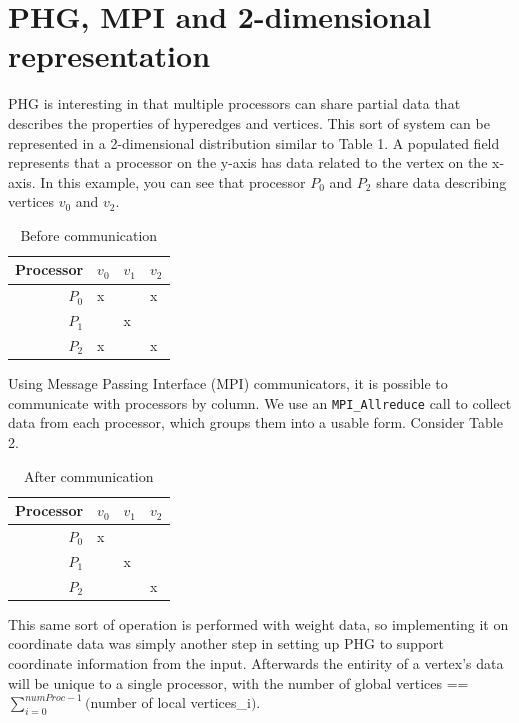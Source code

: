 \documentclass[12pt]{article}
\begin{document}
\section{PHG, MPI and 2-dimensional representation}
PHG is interesting in that multiple processors can share partial data
that describes the properties of hyperedges and vertices. This sort of
system can be represented in a 2-dimensional distribution similar to
Table 1. A populated field represents that a processor on the y-axis has
data related to the vertex on the x-axis. In this example, you can see
that processor $P_0$ and $P_2$ share data describing vertices $v_0$ and
$v_2$.

\begin{table}[h]
\begin{center}
\begin{tabular}{|r|l|l|l|}
  \hline
  Processor & $v_0$ & $v_1$ & $v_2$ \\
  \hline
  $P_0$ & x &   & x \\
  \hline
  $P_1$ &   & x &   \\  
  \hline
  $P_2$ & x &   & x \\
  \hline
\end{tabular}
\caption{\label{tab:0/tc} Before communication}
\end{center}
\end{table}

Using Message Passing Interface (MPI) communicators, it is possible to
communicate with processors by column. We use an \texttt{MPI\_Allreduce}
call to collect data from each processor, which groups them into a usable
form. Consider Table 2.

\begin{table}[h]
\begin{center}
\begin{tabular}{|r|l|l|l|}
  \hline
  Processor & $v_0$ & $v_1$ & $v_2$ \\
  \hline
  $P_0$ & x &   &   \\
  \hline
  $P_1$ &   & x &   \\  
  \hline
  $P_2$ &   &   & x \\
  \hline
\end{tabular}
\caption{\label{tab:1/tc} After communication}
\end{center}
\end{table}

This same sort of operation is performed with weight data, so implementing
it on coordinate data was simply another step in setting up PHG to support
coordinate information from the input. Afterwards the entirity of a vertex's
data will be unique to a single processor, with the number of global
vertices == $\sum_{i=0}^{numProc-1} ($number of local vertices_i$)$.
\end{document}
